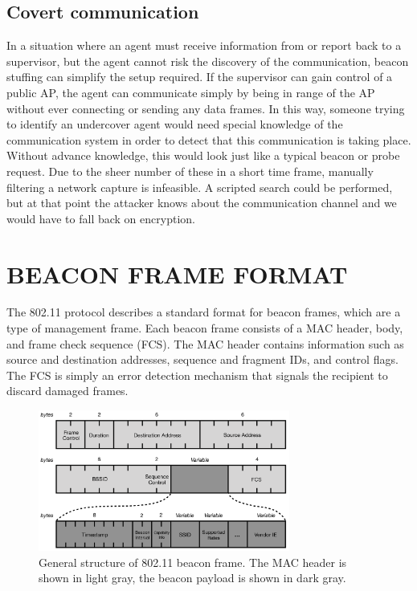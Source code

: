 \documentclass[letterpaper, 10 pt, conference]{ieeeconf}  %
\begin{document}
\subsection{Covert communication}

In a situation where an agent must receive information from or report back to a supervisor, but the agent cannot risk the discovery of the communication, beacon stuffing can simplify the setup required. If the supervisor can gain control of a public AP, the agent can communicate simply by being in range of the AP without ever connecting or sending any data frames.  In this way, someone trying to identify an undercover agent would need special knowledge of the communication system in order to detect that this communication is taking place.  Without advance knowledge, this would look just like a typical beacon or probe request.  Due to the sheer number of these in a short time frame, manually filtering a network capture is infeasible. A scripted search could be performed, but at that point the attacker knows about the communication channel and we would have to fall back on encryption.


\section{BEACON FRAME FORMAT}

The 802.11 protocol describes a standard format for beacon frames, which are a type of management frame.  Each beacon frame consists of a MAC header, body, and frame check sequence (FCS).  The MAC header contains information such as source and destination addresses, sequence and fragment IDs, and control flags.  The FCS is simply an error detection mechanism that signals the recipient to discard damaged frames.

\begin{figure}[h!]
    \includegraphics[width=3.25in]{beaconFrame.png}
    \caption{General structure of 802.11 beacon frame.  The MAC header is shown in light gray, the beacon payload is shown in dark gray.}
    \label{fig:beacon}
\end{figure}
\end{document}

